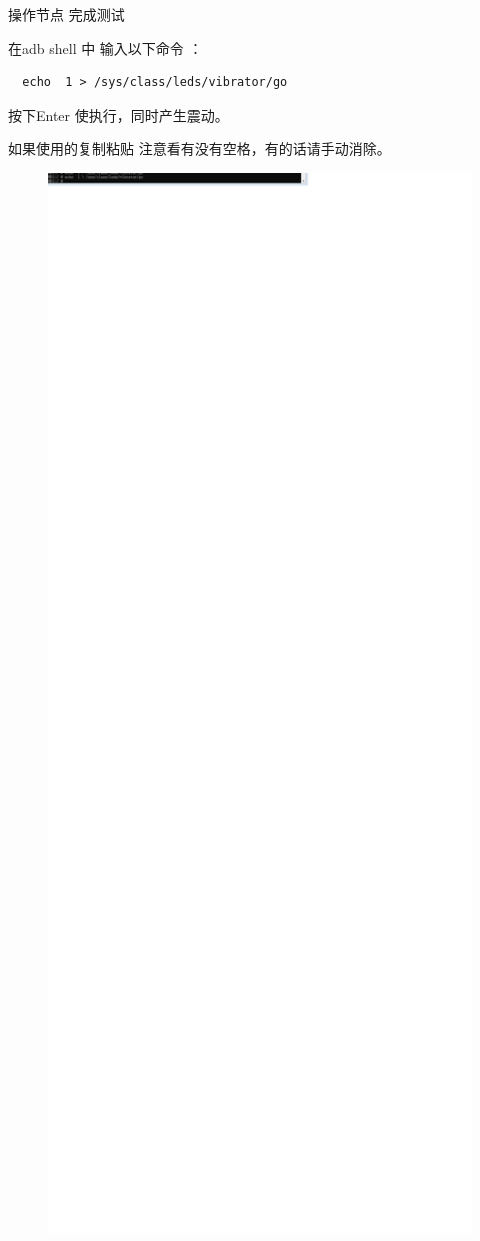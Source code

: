 \begin{frame}[fragile]{操作节点 完成测试}

在adb shell  中 输入以下命令 ：
  \begin{lstlisting}
  echo  1 > /sys/class/leds/vibrator/go
  \end{lstlisting}
按下Enter 使执行，同时产生震动。

如果使用的复制粘贴 注意看有没有空格，有的话请手动消除。

  \begin{figure}[htbp]
  \begin{center}
  \includegraphics[width=15cm]{img/go}

\end{center}
\end{figure}
\end{frame}
